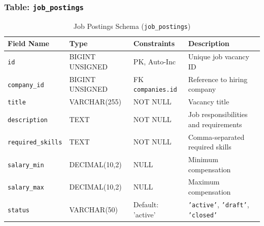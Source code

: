 \subsubsection{Table: \texttt{job\_postings}}
\begin{table}[h!]
\centering
\small
\caption{Job Postings Schema (\texttt{job\_postings})}
\label{tab:schema_job_postings}
\begin{tabular}{|p{3cm}|p{2.8cm}|p{2.2cm}|p{5.5cm}|}
\hline
\textbf{Field Name} & \textbf{Type} & \textbf{Constraints} & \textbf{Description} \\ \hline
\texttt{id} & BIGINT UNSIGNED & PK, Auto-Inc & Unique job vacancy ID \\ \hline
\texttt{company\_id} & BIGINT UNSIGNED & FK \texttt{companies.id} & Reference to hiring company \\ \hline
\texttt{title} & VARCHAR(255) & NOT NULL & Vacancy title \\ \hline
\texttt{description} & TEXT & NOT NULL & Job responsibilities and requirements \\ \hline
\texttt{required\_skills}& TEXT & NOT NULL & Comma-separated required skills \\ \hline
\texttt{salary\_min} & DECIMAL(10,2) & NULL & Minimum compensation \\ \hline
\texttt{salary\_max} & DECIMAL(10,2) & NULL & Maximum compensation \\ \hline
\texttt{status} & VARCHAR(50) & Default: 'active' & \texttt{'active'}, \texttt{'draft'}, \texttt{'closed'} \\ \hline
\end{tabular}
\end{table}

